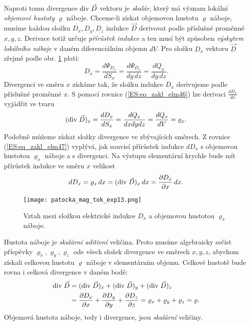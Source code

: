       Naproti tomu divergence \(\mathrm{div}\;\vec{D}\) vektoru je \emph{skalár}, který má význam lokální 
      \emph{objemové hustoty} \(\varrho\) náboje. Chceme-li získat objemovou hustotu \(\varrho\) 
      náboje, musíme každou složku \(D_x, D_y , D_z\) indukce \(\vec{D}\) derivovat podle příslušné 
      proměnné \(x, y, z\). Derivace totiž určuje \emph{přírůstek indukce} a ten musí být způsoben 
      \emph{výskytem lokálního náboje} v daném diferenciálním objemu \(dV\). Pro složku \(D_x\) 
      vektoru \(\vec{D}\) zřejmě podle obr. \ref{es:fig_patocka_mag_tok_exp13} platí:
      \begin{equation}\label{ES:eq_zakl_elm46}
        D_x = \frac{d\Psi_{D_x}}{dS_x} = \frac{d\Psi_{D_x}}{dy\,dz} = \frac{dQ_x}{dy\,dz}. 
      \end{equation} 
      Divergenci ve směru \(x\) získáme tak, že složku indukce \(D_x\) derivujeme podle příslušné 
      proměnné \(x\). S pomocí rovnice (\ref{ES:eq_zakl_elm46}) lze derivaci \(\frac{dD_x}{dx}\) 
      vyjádřit ve tvaru
      \begin{equation}\label{ES:eq_zakl_elm47}
        (\mathrm{div}\;\vec{D})_x = \frac{dD_x}{dS_x} = \frac{dQ_x}{dxdydz} = \frac{dQ_x}{dV} = \varrho_x. 
      \end{equation} 
      Podobně můžeme získat složky divergence ve zbývajících směrech. Z rovnice 
      (\ref{ES:eq_zakl_elm47}) vyplývá, jak souvisí přírůstek indukce \(dD_x\) s objemovou hustotou 
      \(\varrho_x\) náboje a s divergenci. Na výstupu elementární krychle bude mít přírůstek 
      indukce ve směru \(x\) velikost
      \begin{equation}\label{ES:eq_zakl_elm48}
        dD_x = \varrho_x\,dx = (\mathrm{div}\;\vec{D})_x\,dx = \dfrac{\partial D_x}{\partial x}\,dx. 
      \end{equation} 
      \begin{figure}[ht!]
        \centering
        \texttt{[image: patocka\_mag\_tok\_exp13.png]}
        \caption{Vztah mezi složkou elektrické indukce \(D_x\) a objemovou hustotou \(\varrho_x\) 
                 náboje.}
        \label{es:fig_patocka_mag_tok_exp13}
      \end{figure}
      
      Hustota náboje je \emph{skalární aditivní} veličina. Proto musíme algebraicky sečíst 
      příspěvky \(\varrho_x, \varrho_y, \varrho_z\) ode všech složek divergence ve směrech \(x, y, 
      z\), abychom získali celkovou hustotu \(\varrho\) náboje v elementárním objemu. Celkové 
      hustotě bude rovna i celková divergence v daném bodě:
      \begin{align}\label{ES:eq_zakl_elm49}
        \mathrm{div}\;\vec{D} &= (\mathrm{div}\;\vec{D})_x + (\mathrm{div}\;\vec{D})_y + (\mathrm{div}\;\vec{D})_z  \nonumber \\
                  &= \dfrac{\partial D_x}{\partial x} + \dfrac{\partial D_y}{\partial y} + \dfrac{\partial D_z}{\partial z} =
                     \varrho_x + \varrho_y + \varrho_z = \varrho. 
      \end{align} 
      Objemová hustota náboje, tedy i divergence, jsou \emph{skalární} veličiny.
      
